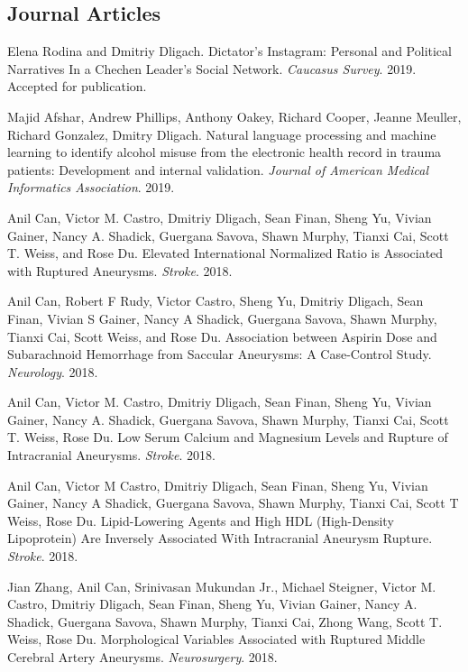 \documentclass[letterpaper]{article}
\renewenvironment{itemize}{
  \begin{list}{}{
    \setlength{\leftmargin}{1.5em}
  }
}{
  \end{list}
}
\begin{document}
\subsection*{Journal Articles}

\begin{itemize}
\item Elena Rodina and Dmitriy Dligach. Dictator's Instagram: Personal and Political Narratives In a Chechen Leader's Social Network. \emph{Caucasus Survey}. 2019. Accepted for publication.
\item Majid Afshar, Andrew Phillips, Anthony Oakey, Richard Cooper, Jeanne Meuller, Richard Gonzalez, Dmitry Dligach. Natural language processing and machine learning to identify alcohol misuse from the electronic health record in trauma patients: Development and internal validation. \emph{Journal of American Medical Informatics Association}. 2019.
\item Anil Can, Victor M. Castro, Dmitriy Dligach, Sean Finan, Sheng Yu, Vivian Gainer, Nancy A. Shadick, Guergana Savova, Shawn Murphy, Tianxi Cai, Scott T. Weiss, and Rose Du. Elevated International Normalized Ratio is Associated with Ruptured Aneurysms. \emph{Stroke}. 2018.
\item Anil Can, Robert F Rudy, Victor Castro, Sheng Yu, Dmitriy Dligach, Sean Finan, Vivian S Gainer, Nancy A Shadick, Guergana Savova, Shawn Murphy, Tianxi Cai, Scott Weiss, and Rose Du. Association between Aspirin Dose and Subarachnoid Hemorrhage from Saccular Aneurysms: A Case-Control Study. \emph{Neurology}. 2018.
\item Anil Can, Victor M. Castro, Dmitriy Dligach, Sean Finan, Sheng Yu, Vivian Gainer, Nancy A. Shadick, Guergana Savova, Shawn Murphy, Tianxi Cai, Scott T. Weiss, Rose Du. Low Serum Calcium and Magnesium Levels and Rupture of Intracranial Aneurysms. \emph{Stroke}. 2018.
\item Anil Can, Victor M Castro, Dmitriy Dligach, Sean Finan, Sheng Yu, Vivian Gainer, Nancy A Shadick, Guergana Savova, Shawn Murphy, Tianxi Cai, Scott T Weiss, Rose Du. Lipid-Lowering Agents and High HDL (High-Density Lipoprotein) Are Inversely Associated With Intracranial Aneurysm Rupture. \emph{Stroke}. 2018.
\item Jian Zhang, Anil Can, Srinivasan Mukundan Jr., Michael Steigner, Victor M. Castro, Dmitriy Dligach, Sean Finan, Sheng Yu, Vivian Gainer, Nancy A. Shadick, Guergana Savova, Shawn Murphy, Tianxi Cai, Zhong Wang, Scott T. Weiss, Rose Du. Morphological Variables Associated with Ruptured Middle Cerebral Artery Aneurysms. \emph{Neurosurgery}. 2018.

\end{itemize}
\end{document}
